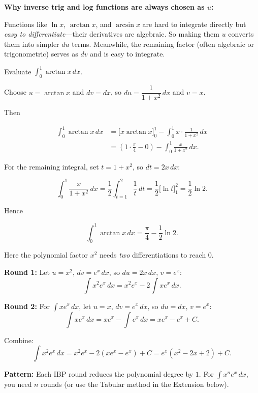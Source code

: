 \textbf{Why inverse trig and log functions are always chosen as $u$:}

Functions like $\ln x$, $\arctan x$, and $\arcsin x$ are hard to integrate directly but \emph{easy to differentiate}---their derivatives are algebraic. So making them $u$ converts them into simpler $du$ terms. Meanwhile, the remaining factor (often algebraic or trigonometric) serves as $dv$ and is easy to integrate.

\begin{examplebox}[title={Worked Example: Definite IBP with a secondary substitution}]

Evaluate $\displaystyle \int_0^1 \arctan x\,dx$.

Choose $u=\arctan x$ and $dv=dx$, so $du=\dfrac{1}{1+x^2}\,dx$ and $v=x$.

Then

\begin{align*}
\int_0^1 \arctan x\,dx
&= \big[x\arctan x\big]_0^1 - \int_0^1 x\cdot \frac{1}{1+x^2}\,dx \\
&= \left(1\cdot\frac{\pi}{4}-0\right) - \int_0^1 \frac{x}{1+x^2}\,dx.
\end{align*}

For the remaining integral, set $t=1+x^2$, so $dt=2x\,dx$:

\[
\int_0^1 \frac{x}{1+x^2}\,dx = \frac12\int_{t=1}^{2}\frac{1}{t}\,dt
= \frac12\big[\ln t\big]_1^2
= \frac12\ln 2.
\]

Hence

\[
\int_0^1 \arctan x\,dx = \frac{\pi}{4}-\frac12\ln 2.
\]

\end{examplebox}

\begin{examplebox}[title={Worked Example: $\displaystyle \int x^2 e^x\,dx$ (two rounds of IBP)}]

Here the polynomial factor $x^2$ needs \emph{two} differentiations to reach $0$.

\textbf{Round 1:} Let $u=x^2$, $dv=e^x\,dx$, so $du=2x\,dx$, $v=e^x$:
\[
\int x^2 e^x\,dx = x^2 e^x - 2\int x e^x\,dx.
\]

\textbf{Round 2:} For $\int x e^x\,dx$, let $u=x$, $dv=e^x\,dx$, so $du=dx$, $v=e^x$:
\[
\int x e^x\,dx = xe^x - \int e^x\,dx = xe^x - e^x + C.
\]

Combine:
\[
\int x^2 e^x\,dx = x^2 e^x - 2(xe^x - e^x) + C = e^x(x^2-2x+2)+C.
\]

\textbf{Pattern:} Each IBP round reduces the polynomial degree by $1$. For $\int x^n e^x\,dx$, you need $n$ rounds (or use the Tabular method in the Extension below).

\end{examplebox}


